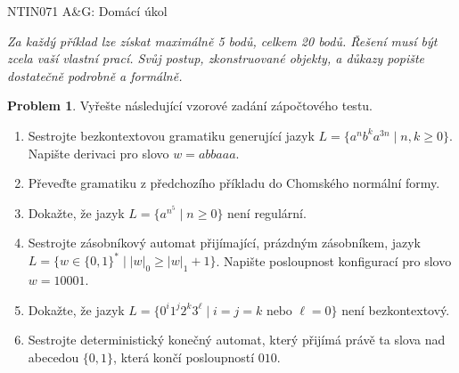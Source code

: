 \documentclass[a4paper,12pt]{article}
\theoremstyle{definition}
\newtheorem{problem}{Problem}
\begin{document}
\begin{center}
    \large{NTIN071 A\&G: Domácí úkol}    
\end{center}


{\it Za každý příklad lze získat maximálně 5 bodů, celkem 20 bodů. Řešení musí být zcela vaší vlastní prací. Svůj postup, zkonstruované objekty, a důkazy popište dostatečně podrobně a formálně.}

\bigskip

\begin{problem}

    Vyřešte následující vzorové zadání zápočtového testu. 

    \begin{enumerate}
        \item Sestrojte bezkontextovou gramatiku generující jazyk $L=\{a^nb^ka^{3n}\mid n,k\geq 0\}$. Napište derivaci pro slovo $w=abbaaa$.
        \item Převeďte gramatiku z předchozího příkladu do Chomského normální formy.
        \item Dokažte, že jazyk $L=\{a^{n^5}\mid n\geq 0\}$ není regulární.
        \item Sestrojte zásobníkový automat přijímající, prázdným zásobníkem, jazyk $L=\{w\in\{0,1\}^*\mid |w|_0\geq |w|_1 + 1\}$. Napište posloupnost konfigurací pro slovo $w=10001$.
        \item Dokažte, že jazyk $L=\{0^i1^j2^k3^\ell\mid i=j=k\text{ nebo }\ell=0\}$ není bezkontextový.
        \item Sestrojte deterministický konečný automat, který přijímá právě ta slova nad abecedou $\{0,1\}$, která končí posloupností $010$.
    \end{enumerate}

\end{problem}


\bigskip
\end{document}
